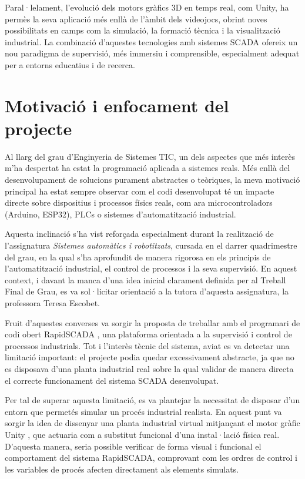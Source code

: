 \documentclass[12pt,a4paper]{report}
\begin{document}
Paral·lelament, l'evolució dels motors gràfics 3D en temps real, com Unity, ha permès la seva aplicació més enllà de l'àmbit dels videojocs, obrint noves possibilitats en camps com la simulació, la formació tècnica i la visualització industrial. La combinació d'aquestes tecnologies amb sistemes SCADA ofereix un nou paradigma de supervisió, més immersiu i comprensible, especialment adequat per a entorns educatius i de recerca.

\section{Motivació i enfocament del projecte}

Al llarg del grau d'Enginyeria de Sistemes TIC, un dels aspectes que més interès m'ha despertat ha estat la programació aplicada a sistemes reals. Més enllà del desenvolupament de solucions purament abstractes o teòriques, la meva motivació principal ha estat sempre observar com el codi desenvolupat té un impacte directe sobre dispositius i processos físics reals, com ara microcontroladors (Arduino, ESP32), PLCs o sistemes d'automatització industrial.


Aquesta inclinació s'ha vist reforçada especialment durant la realització de l'assignatura \textit{Sistemes automàtics i robotitzats}, cursada en el darrer quadrimestre del grau, en la qual s'ha aprofundit de manera rigorosa en els principis de l'automatització industrial, el control de processos i la seva supervisió. En aquest context, i davant la manca d'una idea inicial clarament definida per al Treball Final de Grau, es va sol·licitar orientació a la tutora d'aquesta assignatura, la professora Teresa Escobet.


Fruit d'aquestes converses va sorgir la proposta de treballar amb el programari de codi obert RapidSCADA \cite{RapidScada}, una plataforma orientada a la supervisió i control de processos industrials. Tot i l'interès tècnic del sistema, aviat es va detectar una limitació important: el projecte podia quedar excessivament abstracte, ja que no es disposava d'una planta industrial real sobre la qual validar de manera directa el correcte funcionament del sistema SCADA desenvolupat.


Per tal de superar aquesta limitació, es va plantejar la necessitat de disposar d'un entorn que permetés simular un procés industrial realista. En aquest punt va sorgir la idea de dissenyar una planta industrial virtual mitjançant el motor gràfic Unity \cite{Unity}, que actuaria com a substitut funcional d'una instal·lació física real. D'aquesta manera, seria possible verificar de forma visual i funcional el comportament del sistema RapidSCADA, comprovant com les ordres de control i les variables de procés afecten directament als elements simulats.
\end{document}
